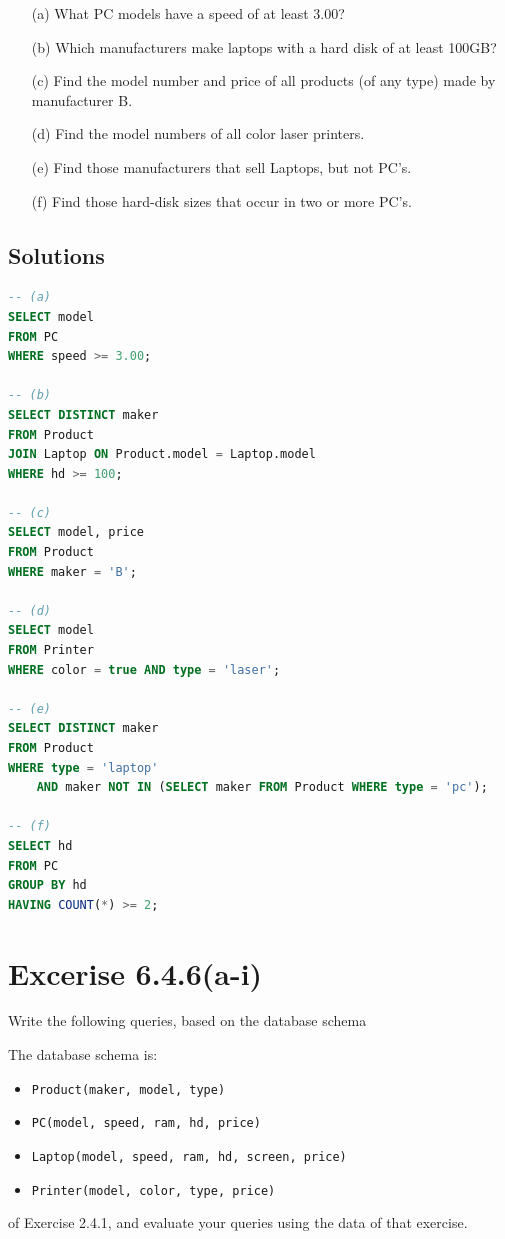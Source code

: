 \documentclass{cshwk}
\begin{document}
\begin{enumerate}
    \item[(a)] What PC models have a speed of at least 3.00?
    \item[(b)] Which manufacturers make laptops with a hard disk of at least 100GB?
    \item[(c)] Find the model number and price of all products (of any type) made by
          manufacturer B.
    \item[(d)] Find the model numbers of all color laser printers.
    \item[(e)] Find those manufacturers that sell Laptops, but not PC's.
    \item[(f)] Find those hard-disk sizes that occur in two or more PC's.
\end{enumerate}

\subsection{Solutions}

\begin{lstlisting}[language=sql]
-- (a) 
SELECT model
FROM PC
WHERE speed >= 3.00;

-- (b)
SELECT DISTINCT maker
FROM Product
JOIN Laptop ON Product.model = Laptop.model
WHERE hd >= 100;

-- (c)
SELECT model, price
FROM Product
WHERE maker = 'B';

-- (d)
SELECT model
FROM Printer
WHERE color = true AND type = 'laser';

-- (e)
SELECT DISTINCT maker
FROM Product
WHERE type = 'laptop'
    AND maker NOT IN (SELECT maker FROM Product WHERE type = 'pc');

-- (f)
SELECT hd
FROM PC
GROUP BY hd
HAVING COUNT(*) >= 2;
\end{lstlisting}

\section{Excerise 6.4.6(a-i)}

Write the following queries, based on the database schema

The database schema is:
\begin{itemize}
    \item \texttt{Product(maker, model, type)}
    \item \texttt{PC(model, speed, ram, hd, price)}
    \item \texttt{Laptop(model, speed, ram, hd, screen, price)}
    \item \texttt{Printer(model, color, type, price)}
\end{itemize}
of Exercise 2.4.1, and evaluate your queries using the data of that exercise.
\end{document}
